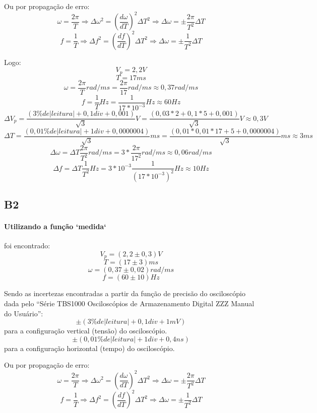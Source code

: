         Ou por propagação de erro:
        $$\omega = \frac{2\pi}{T} \Rightarrow \Delta \omega^2 = (\frac{d\omega}{dT})^2 \Delta T^2 \Rightarrow \Delta \omega = \pm\frac{2\pi}{T^2} \Delta T$$
        $$f = \frac{1}{T} \Rightarrow \Delta f^2 = (\frac{df}{dT})^2 \Delta T^2 \Rightarrow \Delta \omega = \pm\frac{1}{T^2} \Delta T$$
        \newline

        Logo:
        $$V_p = 2,2 V$$
        $$T = 17 ms$$
        $$\omega = \frac{2\pi}{T} rad/ms = \frac{2\pi}{17} rad/ms \approx 0,37 rad/ms$$
        $$f = \frac{1}{T} Hz = \frac{1}{17*10^{-3}} Hz \approx 60 Hz$$
        \newline  
        $$\Delta V_p = \frac{(3\% de |leitura| + 0,1 div + 0,001)}{\sqrt{3}} V = \frac{(0,03*2 + 0,1*5 + 0,001)}{\sqrt{3}} V \approx 0,3 V$$
        $$\Delta T = \frac{(0,01\% de |leitura| + 1 div + 0,0000004)}{\sqrt{3}} ms = \frac{(0,01*0,01*17+5+0,0000004)}{\sqrt{3}} ms \approx 3 ms$$
        $$\Delta \omega = \Delta T\frac{2\pi}{T^2} rad/ms = 3*\frac{2\pi}{17^2} rad/ms \approx 0,06 rad/ms$$
        $$\Delta f = \Delta T\frac{1}{T^2} Hz = 3*10^{-3}\frac{1}{(17*10^{-3})^2} Hz \approx 10 Hz$$


    \subsection{B2}
        \paragraph{Utilizando a função `medida`} foi encontrado: 
        $$V_p = (2,2 \pm 0,3)V$$
        $$T = (17 \pm 3)ms$$
        $$\omega = (0,37 \pm 0,02)rad/ms$$
        $$f = (60 \pm 10)Hz$$

        Sendo as incertezas encontradas a partir 
        da função de precisão do osciloscópio 
        dada pelo “Série TBS1000 Osciloscópios de 
        Armazenamento Digital ZZZ Manual do Usuário”:
        $$\pm(3\% de |leitura| + 0,1 div + 1mV)$$
        para a configuração vertical (tensão) 
        do osciloscópio.
        $$\pm(0,01\% de |leitura| + 1 div + 0,4ns)$$
        para a configuração horizontal (tempo) 
        do osciloscópio.

        Ou por propagação de erro:
        $$\omega = \frac{2\pi}{T} \Rightarrow \Delta \omega^2 = (\frac{d\omega}{dT})^2 \Delta T^2 \Rightarrow \Delta \omega = \pm\frac{2\pi}{T^2} \Delta T$$
        $$f = \frac{1}{T} \Rightarrow \Delta f^2 = (\frac{df}{dT})^2 \Delta T^2 \Rightarrow \Delta \omega = \pm\frac{1}{T^2} \Delta T$$
        \newline

